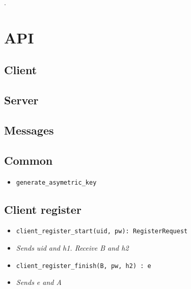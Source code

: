\documentclass[../report.tex]{subfiles}
\begin{document}
\newpage
.
\newpage















\section{API}




\subsection{Client}
\subsection{Server}
\subsection{Messages}

\subsection{Common}
\begin{itemize}
 \item \verb|generate_asymetric_key|
\end{itemize}


\subsection{Client register}
\begin{itemize}
 \item \verb|client_register_start(uid, pw): RegisterRequest|
 \item \emph{Sends uid and h1. Receive B and h2}
 \item \verb|client_register_finish(B, pw, h2) : e|
 \item \emph{Sends e and A}
\end{itemize}
\end{document}
